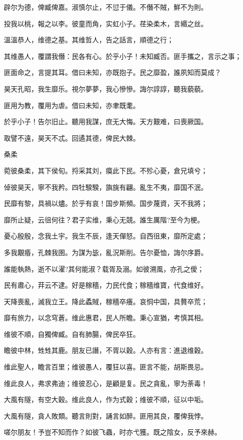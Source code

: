 辟尔为德，俾臧俾嘉。淑慎尔止，不愆于儀。不僭不賊，鮮不为則。

投我以桃，報之以李。彼童而角，实虹小子。荏染柔木，言緡之丝。

溫溫恭人，维德之基。其维哲人，告之話言，順德之行；

其维愚人，覆謂我僭：民各有心。於乎小子！未知臧否。匪手攜之，言示之事；

匪面命之，言提其耳。借曰未知，亦既抱子。民之靡盈，誰夙知而莫成？

昊天孔昭，我生靡乐。視尔夢夢，我心慘慘。誨尔諄諄，聽我藐藐。

匪用为教，覆用为虐。借曰未知，亦聿既耄。

於乎小子！告尔旧止。聽用我謀，庶无大悔。天方艱难，曰喪厥国。

取譬不遠，昊天不忒。回遹其德，俾民大棘。

桑柔

菀彼桑柔，其下侯旬。捋采其刘，瘼此下民。不殄心憂，倉兄填兮；

倬彼昊天，寧不我矜。四牡騤騤，旟旐有翩。亂生不夷，靡国不泯。

民靡有黎，具禍以燼。於乎有哀！国步斯頻。国步蔑資，天不我將；

靡所止疑，云徂何往？君子实维，秉心无競。誰生厲階?至今为梗。

憂心殷殷，念我土宇。我生不辰，逢天僤怒。自西徂東，靡所定處；

多我覯痻，孔棘我圉。为謀为毖，亂況斯削。告尔憂恤，誨尔序爵。

誰能執熱，逝不以濯?其何能淑？载胥及溺。如彼溯風，亦孔之僾；

民有肅心，荓云不逮。好是稼穡，力民代食；稼穡维寶，代食维好。

天降喪亂，滅我立王。降此蟊賊，稼穡卒癢。哀恫中国，具贅卒荒；

靡有旅力，以念穹蒼。维此惠君，民人所瞻。秉心宣猶，考慎其相。

维彼不順，自獨俾臧。自有肺腸，俾民卒狂。

瞻彼中林，甡甡其鹿。朋友已譖，不胥以穀。人亦有言：進退维穀。

维此聖人，瞻言百里；维彼愚人，覆狂以喜。匪言不能，胡斯畏忌。

维此良人，弗求弗迪；维彼忍心，是顧是复。民之貪亂，寧为荼毒！

大風有隧，有空大穀。维此良人，作为式穀；维彼不順，征以中垢。

大風有隧，貪人敗類。聽言則對，誦言如醉。匪用其良，覆俾我悖。

嗟尔朋友！予豈不知而作？如彼飞蟲，时亦弋獲。既之陰女，反予來赫。

